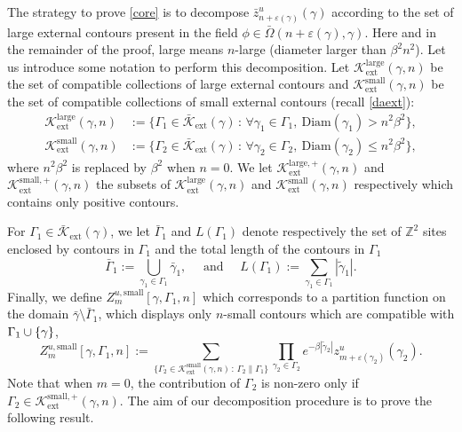 \documentclass[10pt]{amsart}
\let\mathcal\mathscr
\newcommand{\sep}{\,:\,}
\numberwithin{equation}{section}
\theoremstyle{plain}
\theoremstyle{definition}
\newcommand{\ext}{\mathrm{ext}}
\newcommand{\sm}{\mathrm{small}}
\newcommand{\Diam}{\mathrm{Diam}}
\newcommand{\larg}{\mathrm{large}}
\newcommand{\cK}{{\ensuremath{\mathcal K}} }
\newcommand{\bbZ}{{\ensuremath{\mathbb Z}} }
\newcommand{\gb}{\beta}
\newcommand{\gep}{\varepsilon}
\newcommand{\gG}{\Gamma}
\newcommand{\gO}{\Omega}
\begin{document}
The strategy to prove \eqref{core} is to decompose $\bar z^u_{n+\gep(\gamma)}(\gamma)$ according to the set
of large external contours present in the field $\phi \in \bar \gO(n+\gep(\gamma),\gamma)$.
Here and in the remainder of the proof, large means $n$-large (diameter larger than $\gb^2n^2$). Let us introduce some notation to perform this decomposition.
Let $\cK^{\larg}_{\ext}(\gamma,n)$ be the set of compatible collections of large external contours and $\cK^{\sm}_{\ext}(\gamma,n)$ be
the set of compatible collections of small external contours (recall \eqref{daext}):
\begin{equation}\label{smallandbig}
\begin{split}
\cK^{\larg}_{\ext}(\gamma,n)&:= \{ \gG_1 \in \bar \cK_{\ext}(\gamma) \sep \forall \gamma_1\in \gG_1,\ \Diam(\gamma_1)>n^2\gb^2\},\\
\cK^{\sm}_{\ext}(\gamma,n)&:= \{ \gG_2 \in \bar \cK_{\ext}(\gamma) \sep \forall \gamma_2\in \gG_2,\ \Diam(\gamma_2)\le n^2\gb^2\},
\end{split}
\end{equation}
where $n^2\gb^2$ is replaced by $\gb^2$ when $n=0$.
We let $\cK^{\larg,+}_{\ext}(\gamma,n)$ and $\cK^{\sm,+}_{\ext}(\gamma,n)$ the subsets of $\cK^{\larg}_{\ext}(\gamma,n)$ and $\cK^{\sm}_{\ext}(\gamma,n)$ respectively
which contains only positive contours.

For $\gG_1\in \bar \cK_{\ext}(\gamma)$, we let $\bar \gG_1$ and $L(\gG_1)$ denote respectively the set of $\bbZ^2$ sites
enclosed by contours in $\gG_1$ and the total length
of the contours in $\gG_1$
\begin{equation}\label{interiors}
\bar \gG_1:=\bigcup_{\gamma_1\in \gG_1} \bar \gamma_1, \quad \text{ and }\quad L(\gG_1):=\sum_{\gamma_1\in \gG_1} |\tilde \gamma_1|.
\end{equation}
Finally, we define $Z^{u,\sm}_{m}[\gamma,\gG_1,n]$ which corresponds to a partition function on the domain
$\bar \gamma \setminus \bar \gG_1$,
which displays only $n$-small contours which are
compatible with $\gG_1\cup\nobreak \{\gamma\}$,%
\begin{equation*}%
Z^{u,\sm}_{m}[\gamma,\gG_1,n]:= \sum_{ \{\gG_2 \in \cK^{\sm}_{\ext}(\gamma,n) \sep \gG_2 \parallel \gG_1\}} \prod_{\gamma_2\in \gG_2 } e^{-\gb |\tilde\gamma_2|}
z^u_{m+\gep(\gamma_2)}(\gamma_2).
\end{equation*}
Note that when $m=0$, the contribution of $\gG_2$ is non-zero only if $\gG_2 \in \cK^{\sm,+}_{\ext}(\gamma,n)$.
The aim of our decomposition procedure is to prove the following result.
\end{document}
